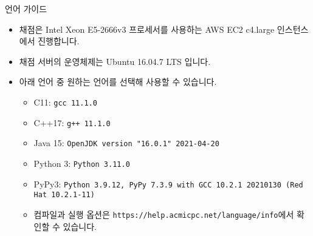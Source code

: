 {
    \indent
    \Large
    
    언어 가이드
}

\begin{itemize}[noitemsep]

    \item 채점은 Intel Xeon E5-2666v3 프로세서를 사용하는 AWS EC2 c4.large 인스턴스에서 진행합니다.
    \item 채점 서버의 운영체제는 Ubuntu 16.04.7 LTS 입니다.
    \item 아래 언어 중 원하는 언어를 선택해 사용할 수 있습니다.
    
    \begin{itemize}[noitemsep]
        \item C11: \texttt{gcc 11.1.0} %
        \item C++17: \texttt{g++ 11.1.0} %
        \item Java 15: \texttt{OpenJDK version "16.0.1" 2021-04-20} %
        \item Python 3: \texttt{Python 3.11.0} %
        \item PyPy3: \texttt{Python 3.9.12, PyPy 7.3.9 with GCC 10.2.1 20210130 (Red Hat 10.2.1-11)} %
        \item 컴파일과 실행 옵션은 \texttt{https://help.acmicpc.net/language/info}에서 확인할 수 있습니다.
        

\end{itemize}
\end{itemize}
